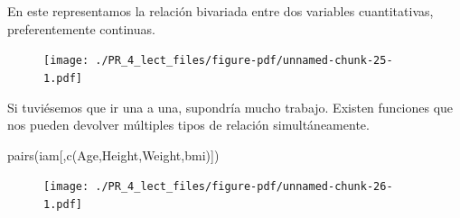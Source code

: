 \documentclass[
  letterpaper,
  DIV=11,
  numbers=noendperiod]{scrreprt}
\newenvironment{Shaded}{\begin{snugshade}}{\end{snugshade}}
\newcommand{\AttributeTok}[1]{\textcolor[rgb]{0.40,0.45,0.13}{#1}}
\newcommand{\CommentTok}[1]{\textcolor[rgb]{0.37,0.37,0.37}{#1}}
\newcommand{\DecValTok}[1]{\textcolor[rgb]{0.68,0.00,0.00}{#1}}
\newcommand{\FunctionTok}[1]{\textcolor[rgb]{0.28,0.35,0.67}{#1}}
\newcommand{\NormalTok}[1]{\textcolor[rgb]{0.00,0.23,0.31}{#1}}
\newcommand{\SpecialCharTok}[1]{\textcolor[rgb]{0.37,0.37,0.37}{#1}}
\newcommand{\StringTok}[1]{\textcolor[rgb]{0.13,0.47,0.30}{#1}}
\begin{document}
En este representamos la relación bivariada entre dos variables
cuantitativas, preferentemente continuas.

\begin{Shaded}
\end{Shaded}

\begin{figure}[H]

{\centering \texttt{[image: ./PR\_4\_lect\_files/figure-pdf/unnamed-chunk-25-1.pdf]}

}

\end{figure}

Si tuviésemos que ir una a una, supondría mucho trabajo. Existen
funciones que nos pueden devolver múltiples tipos de relación
simultáneamente.

\begin{Shaded}
\begin{Highlighting}[]
\FunctionTok{pairs}\NormalTok{(iam[,}\FunctionTok{c}\NormalTok{(}\StringTok{\textquotesingle{}Age\textquotesingle{}}\NormalTok{,}\StringTok{\textquotesingle{}Height\textquotesingle{}}\NormalTok{,}\StringTok{\textquotesingle{}Weight\textquotesingle{}}\NormalTok{,}\StringTok{\textquotesingle{}bmi\textquotesingle{}}\NormalTok{)])}
\end{Highlighting}
\end{Shaded}

\begin{figure}[H]

{\centering \texttt{[image: ./PR\_4\_lect\_files/figure-pdf/unnamed-chunk-26-1.pdf]}

}

\end{figure}
\end{document}
